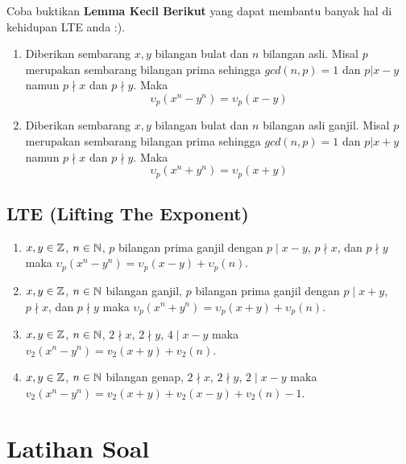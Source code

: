 \documentclass[12pt]{scrartcl}
\begin{document}
Coba buktikan \textbf{Lemma Kecil Berikut} yang dapat membantu banyak hal di kehidupan LTE anda :).

\begin{enumerate}[resume]
    \item Diberikan sembarang $x,y$ bilangan bulat dan $n$ bilangan asli. Misal $p$ merupakan sembarang bilangan prima sehingga $gcd(n,p)=1$ dan $p|x-y$ namun $p\nmid x$ dan $p\nmid y$. Maka
    \[\upsilon_p(x^n-y^n) = \upsilon_p(x-y)\]
    \item Diberikan sembarang $x,y$ bilangan bulat dan $n$ bilangan asli ganjil. Misal $p$ merupakan sembarang bilangan prima sehingga $gcd(n,p)=1$ dan $p|x+y$ namun $p\nmid x$ dan $p\nmid y$. Maka
    \[\upsilon_p(x^n+y^n) = \upsilon_p(x+y)\]
\end{enumerate}

\subsection{LTE (Lifting The Exponent)}
\begin{enumerate}
    \item [Lemma 1] $x,y \in \mathbb Z$, $n \in \mathbb N$, $p$ bilangan prima ganjil dengan $p \mid x-y$, $p \nmid x$, dan $p \nmid y$ maka $\upsilon_p(x^n-y^n)=\upsilon_p(x-y)+\upsilon_p(n)$.
    \item [Lemma 2] $x,y \in \mathbb Z$, $n \in \mathbb N$ bilangan ganjil, $p$ bilangan prima ganjil dengan $p \mid x+y$, $p \nmid x$, dan $p \nmid y$ maka $\upsilon_p(x^n+y^n)=\upsilon_p(x+y)+\upsilon_p(n)$.
    \item [Lemma 3] $x,y \in \mathbb Z$, $n \in \mathbb N$, $2 \nmid x$, $2 \nmid y$,  $4 \mid x-y$  maka $v_2(x^n-y^n)=v_2(x+y)+v_2(n)$.
    \item [Lemma 4] $x,y \in \mathbb Z$, $n \in \mathbb N$ bilangan genap, $2 \nmid x$, $2 \nmid y$,  $2 \mid x-y$ maka $v_2(x^n-y^n)=v_2(x+y)+v_2(x-y)+v_2(n)-1$.
\end{enumerate}

\section{Latihan Soal}
\end{document}
